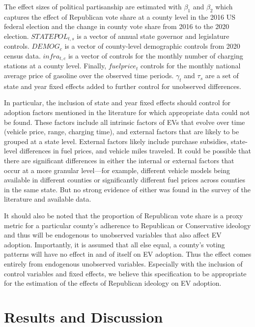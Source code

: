 \documentclass{article}
\begin{document}
The effect sizes of political partisanship are estimated with $\beta_{1}$ and $\beta_{2}$ which captures the effect of Republican vote share at a county level in the 2016 US federal election and the change in county vote share from 2016 to the 2020 election. $STATEPOL_{t,s}$ is a vector of annual state governor and legislature controls. $DEMOG_{c}$ is a vector of county-level demographic controls from 2020 census data. $infra_{t,c}$ is a vector of controls for the monthly number of charging stations at a county level. Finally, $fuelprice_{t}$ controls for the monthly national average price of gasoline over the observed time periods. $\gamma_{t}$ and $\tau_{s}$ are a set of state and year fixed effects added to further control for unobserved differences.

In particular, the inclusion of state and year fixed effects should control for adoption factors mentioned in the literature for which appropriate data could not be found. These factors include all intrinsic factors of EVs that evolve over time (vehicle price, range, charging time), and external factors that are likely to be grouped at a state level. External factors likely include purchase subsidies, state-level differences in fuel prices, and vehicle miles traveled. It could be possible that there are significant differences in either the internal or external factors that occur at a more granular level—for example, different vehicle models being available in different counties or significantly different fuel prices across counties in the same state. But no strong evidence of either was found in the survey of the literature and available data. 

It should also be noted that the proportion of Republican vote share is a proxy metric for a particular county's adherence to Republican or Conservative ideology and thus will be endogenous to unobserved variables that also affect EV adoption. Importantly, it is assumed that all else equal, a county's voting patterns will have no effect in and of itself on EV adoption. Thus the effect comes entirely from endogenous unobserved variables. Especially with the inclusion of control variables and fixed effects, we believe this specification to be appropriate for the estimation of the effects of Republican ideology on EV adoption. 

\section{Results and Discussion}
\end{document}
